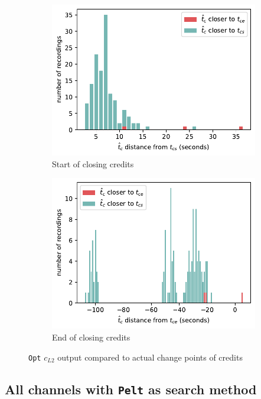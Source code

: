 \begin{figure}[h]
\begin{subfigure}[t]{.49\textwidth}
      \includegraphics[width=\linewidth]{../plots/distances/opt_l2_dist_end_first.pdf}
      \caption{Start of closing credits}
      \label{fig:t_diff_opt_cs}
    \end{subfigure}
    \begin{subfigure}[t]{.49\textwidth}
      \centering
      \includegraphics[width=\linewidth]{../plots/distances/opt_l2_dist_end_last.pdf}
      \caption{End of closing credits}
      \label{fig:t_diff_opt_ce}
    \end{subfigure}
  \caption{\texttt{Opt} $c_{L2}$ output compared to actual change points of credits}
  \label{fig:t_diff_opt_credits}
\end{figure}

\subsection{All channels with \texttt{Pelt} as search method} \label{sec:results_pelt}

